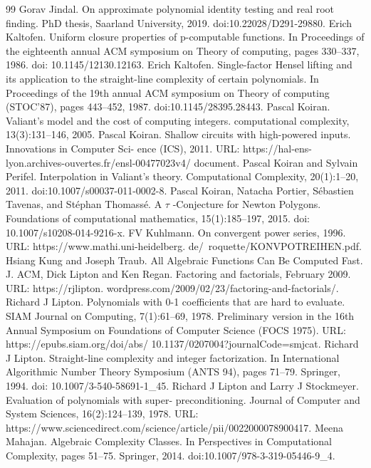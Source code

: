 \documentclass[10pt,a4paper]{article}
\begin{document}
\begin{thebibliography}{99}
 Gorav Jindal. On approximate polynomial identity testing and real root finding. PhD thesis, Saarland University, 2019. doi:10.22028/D291-29880.
 Erich Kaltofen. Uniform closure properties of p-computable functions. In Proceedings of the eighteenth annual ACM symposium on Theory of computing, pages 330–337, 1986. doi: 10.1145/12130.12163.
 Erich Kaltofen. Single-factor Hensel lifting and its application to the straight-line complexity of certain polynomials. In Proceedings of the 19th annual ACM symposium on Theory of computing (STOC’87), pages 443–452, 1987. doi:10.1145/28395.28443.
 Pascal Koiran. Valiant’s model and the cost of computing integers. computational complexity, 13(3):131–146, 2005.
 Pascal Koiran. Shallow circuits with high-powered inputs. Innovations in Computer Sci- ence (ICS), 2011. URL: https://hal-ens-lyon.archives-ouvertes.fr/ensl-00477023v4/ document.
 Pascal Koiran and Sylvain Perifel. Interpolation in Valiant’s theory. Computational Complexity, 20(1):1–20, 2011. doi:10.1007/s00037-011-0002-8.
 Pascal Koiran, Natacha Portier, Sébastien Tavenas, and Stéphan Thomassé. A $\tau$ -Conjecture for Newton Polygons. Foundations of computational mathematics, 15(1):185–197, 2015. doi: 10.1007/s10208-014-9216-x.
 FV Kuhlmann. On convergent power series, 1996. URL: https://www.mathi.uni-heidelberg. de/~roquette/KONVPOTREIHEN.pdf.
 Hsiang Kung and Joseph Traub. All Algebraic Functions Can Be Computed Fast. J. ACM,
 Dick Lipton and Ken Regan. Factoring and factorials, February 2009. URL: https://rjlipton. wordpress.com/2009/02/23/factoring-and-factorials/.
 Richard J Lipton. Polynomials with 0-1 coefficients that are hard to evaluate. SIAM Journal on Computing, 7(1):61–69, 1978. Preliminary version in the 16th Annual Symposium on Foundations of Computer Science (FOCS 1975). URL: https://epubs.siam.org/doi/abs/ 10.1137/0207004?journalCode=smjcat.
 Richard J Lipton. Straight-line complexity and integer factorization. In International Algorithmic Number Theory Symposium (ANTS 94), pages 71–79. Springer, 1994. doi: 10.1007/3-540-58691-1\_45.
 Richard J Lipton and Larry J Stockmeyer. Evaluation of polynomials with super- preconditioning. Journal of Computer and System Sciences, 16(2):124–139, 1978. URL: https://www.sciencedirect.com/science/article/pii/0022000078900417.
 Meena Mahajan. Algebraic Complexity Classes. In Perspectives in Computational Complexity, pages 51–75. Springer, 2014. doi:10.1007/978-3-319-05446-9\_4.

\end{thebibliography}
\end{document}
